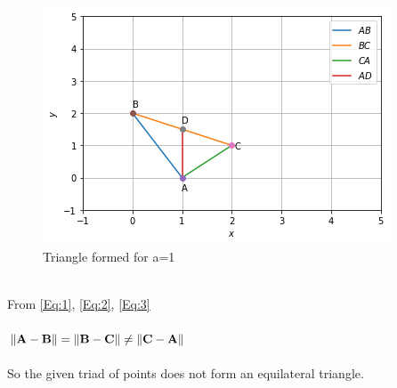\documentclass[journal,12pt,twocolumn]{IEEEtran}
\begin{document}
\begin{figure}[!ht]
   \centering
   \includegraphics[width=\columnwidth]{BOP.png}
   \caption{Triangle formed for a=1}
   
\end{figure}\\
From {\eqref{Eq:1}}, {\eqref{Eq:2}}, {\eqref{Eq:3}}\\\\
$\lVert \mathbf{A} - \mathbf{B}\rVert = \lVert \mathbf{B} - \mathbf{C}\rVert  \neq \lVert \mathbf{C} - \mathbf{A}\rVert $ \\\\
So the given triad of points does not form an equilateral triangle.
\end{document}
